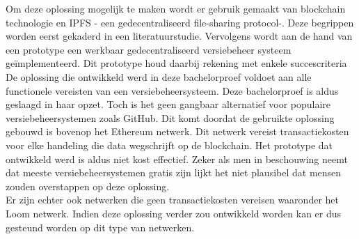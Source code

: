 Om deze oplossing mogelijk te maken wordt er gebruik gemaakt van blockchain technologie en IPFS - een gedecentraliseerd file-sharing protocol-. Deze begrippen worden eerst gekaderd in een literatuurstudie. Vervolgens wordt aan de hand van een prototype een werkbaar gedecentraliseerd versiebeheer systeem geïmplementeerd. Dit prototype houd daarbij rekening met enkele succescriteria\\

De oplossing die ontwikkeld werd in deze bachelorproef voldoet aan alle functionele vereisten van een versiebeheersysteem. Deze bachelorproef is aldus geslaagd in haar opzet. Toch is het geen gangbaar alternatief voor populaire versiebeheersystemen zoals GitHub. Dit komt doordat de gebruikte oplossing gebouwd is bovenop het Ethereum netwerk. Dit netwerk vereist transactiekosten voor elke handeling die data wegschrijft op de blockchain. Het prototype dat ontwikkeld werd is aldus niet kost effectief. Zeker als men in beschouwing neemt dat meeste versiebeheersystemen gratis zijn lijkt het niet plausibel dat mensen zouden overstappen op deze oplossing.\\

Er zijn echter ook netwerken die geen transactiekosten vereisen waaronder het Loom netwerk. Indien deze oplossing verder zou ontwikkeld worden kan er dus gesteund worden op dit type van netwerken.